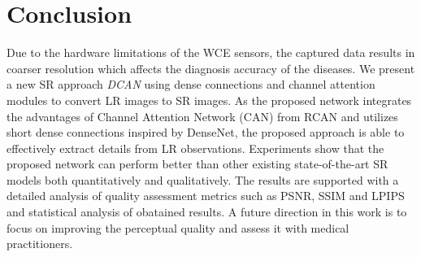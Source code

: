 \documentclass[conference]{IEEEtran}
\begin{document}
\section{Conclusion}
Due to the hardware limitations of the WCE sensors, the captured data results in coarser resolution which affects the diagnosis accuracy of the diseases. We present a new SR approach \emph{DCAN} using dense connections and channel attention modules to convert LR images to SR images. As the proposed network integrates the advantages of Channel Attention Network (CAN) from RCAN and utilizes short dense connections inspired by DenseNet, the proposed approach is able to effectively extract details from LR observations.
Experiments show that the proposed  network can perform better than other  existing state-of-the-art SR models both quantitatively and qualitatively. The results are supported with a detailed analysis of quality assessment metrics such as PSNR, SSIM and LPIPS and statistical analysis of obatained results. A future direction in this work is to focus on improving the perceptual quality and assess it with medical practitioners. 





\end{document}
